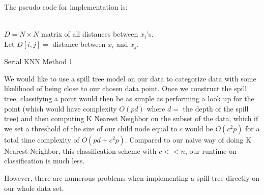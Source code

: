 \vspace{5 mm}
\noindent
The pseudo code for implementation is:

\begin{algorithm}
\DontPrintSemicolon
{} \\
\hspace{29pt} $D = N \times N $ matrix of all distances between $x_{i}$'s. \\
\hspace{50pt} Let $D[i, j] = $ distance between $x_{i}$ and $x_{j}$.
\caption{Serial KNN Method 1\label{KNN1}}
\end{algorithm}

\vspace{5 mm}
\noindent
We would like to use a spill tree model on our data to categorize data with 
some likelihood of being close to our chosen data point. Once we 
construct the spill tree, classifying a point would then be as simple as 
performing a look up for the point (which would have complexity $O(p d)$ where 
$d = $ the depth of the spill tree) and then computing K Nearest Neighbor on 
the subset of the data, which if we set a threshold of the size of our child 
node equal to $c$ would be $O(c^{2} p)$ for a total time complexity of 
$O(p d + c^{2} p)$. Compared to our naive way of doing K Nearest Neighbor, 
this classification scheme with $c << n$, our runtime on classification is much 
less.

\vspace{5 mm}
\noindent
However, there are numerous problems when implementing a spill tree directly 
on our whole data set.


